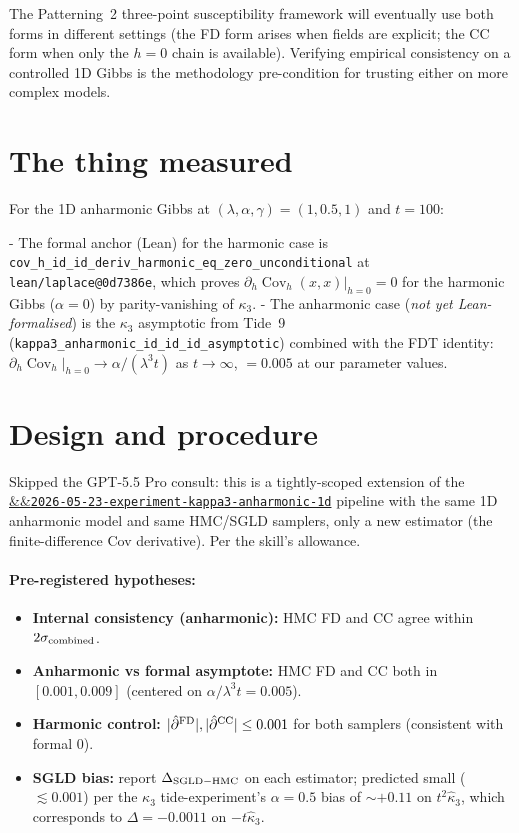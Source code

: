 \documentclass[11pt]{article}
\newcommand{\experimentref}[2][]{\href{https://therisensea.org/experiments/#2/}{\ifx&#1&\texttt{#2}\else#1\fi}}
\newcommand{\Cov}{\operatorname{Cov}}
\begin{document}
The Patterning~2 three-point susceptibility framework will eventually
use both forms in different settings (the FD form arises when fields
are explicit; the CC form when only the $h = 0$ chain is available).
Verifying empirical consistency on a controlled 1D Gibbs is the
methodology pre-condition for trusting either on more complex models.

\section{The thing measured}

For the 1D anharmonic Gibbs at $(\lambda, \alpha, \gamma) = (1, 0.5, 1)$
and $t = 100$:

- The formal anchor (Lean) for the harmonic case is
  \texttt{cov\_h\_id\_id\_deriv\_harmonic\_eq\_zero\_unconditional}
  at \texttt{lean/laplace@0d7386e}, which proves
  $\partial_h \Cov_h(x, x)\big|_{h=0} = 0$ for the harmonic Gibbs
  ($\alpha = 0$) by parity-vanishing of $\kappa_3$.
- The anharmonic case (\emph{not yet Lean-formalised}) is the
  $\kappa_3$ asymptotic from Tide~9
  (\texttt{kappa3\_anharmonic\_id\_id\_id\_asymptotic}) combined with
  the FDT identity: $\partial_h \Cov_h|_{h=0} \to \alpha / (\lambda^3 t)$
  as $t \to \infty$, $= 0.005$ at our parameter values.

\section{Design and procedure}

Skipped the GPT-5.5 Pro consult: this is a tightly-scoped extension
of the
\experimentref{2026-05-23-experiment-kappa3-anharmonic-1d} pipeline
with the same 1D anharmonic model and same HMC/SGLD samplers, only
a new estimator (the finite-difference Cov derivative). Per the
skill's allowance.

\paragraph{Pre-registered hypotheses:}
\begin{itemize}[noitemsep,leftmargin=*]
\item \textbf{Internal consistency (anharmonic):} HMC FD and CC agree
  within $2\sigma_{\rm combined}$.
\item \textbf{Anharmonic vs formal asymptote:} HMC FD and CC both in
  $[0.001, 0.009]$ (centered on $\alpha/\lambda^3 t = 0.005$).
\item \textbf{Harmonic control:} $|\hat\partial^{\rm FD}|, |\hat\partial^{\rm CC}|
  \leq 0.001$ for both samplers (consistent with formal $0$).
\item \textbf{SGLD bias:} report $\Delta_{\rm SGLD-HMC}$ on each
  estimator; predicted small ($\lesssim 0.001$) per the
  $\kappa_3$ tide-experiment's $\alpha = 0.5$ bias of $\sim +0.11$ on
  $t^2 \hat\kappa_3$, which corresponds to $\Delta = -0.0011$ on
  $-t \hat\kappa_3$.
\end{itemize}
\end{document}

